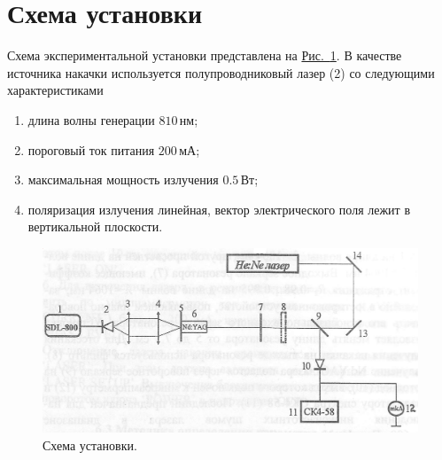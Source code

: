 \documentclass[12pt]{article}
\newcommand*{\figref}[2][]{\hyperref[#2]{Рис.~\ref*{#2}#1}}
\begin{document}
	\section{Схема установки}

	Схема экспериментальной установки представлена на \figref{fig:scheme}. В качестве источника накачки используется полупроводниковый лазер (2) со следующими характеристиками
	\begin{enumerate}
		\item длина волны генерации $810\,\text{нм}$;
		\item пороговый ток питания $200\,\text{мА}$;
		\item максимальная мощность излучения $0.5\,\text{Вт}$;
		\item поляризация излучения линейная, вектор электрического поля лежит в вертикальной плоскости.
	\end{enumerate}
	
	\begin{figure}[htbp]
		\centering
		\includegraphics[width=\textwidth]{../figures/scheme.png}
		\caption{Схема установки.}
		\label{fig:scheme}
	\end{figure}
\end{document}
